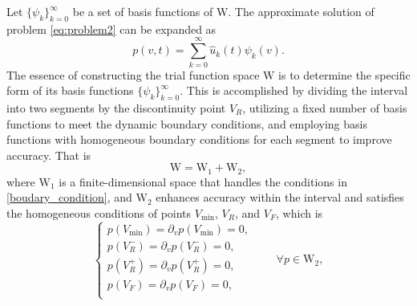 Let $\{\psi_k\}_{k=0}^{\infty}$ be a set of basis functions of $\mathrm{W}$. The approximate solution of problem \eqref{eq:problem2} can be expanded as
\begin{equation}
    \label{eq:approximate_solution1}
    p(v,t)=\sum_{k=0}^{\infty}\hat{u}_k(t)\psi_k(v).
\end{equation}
The essence of constructing the trial function space $\mathrm{W}$ is to determine the specific form of its basis functions $\{\psi_k\}_{k=0}^{\infty}$. This is accomplished by dividing the interval into two segments by the discontinuity point $V_R$, utilizing a fixed number of basis functions to meet the dynamic boundary conditions, and employing basis functions with homogeneous boundary conditions for each segment to improve accuracy. That is
\begin{equation}
    \mathrm{W}=\mathrm{W}_1+\mathrm{W}_2,
\end{equation}
where $\mathrm{W}_1$ is a finite-dimensional space that handles the conditions in \eqref{boudary_condition}, and $\mathrm{W}_2$ enhances accuracy within the interval and satisfies the homogeneous conditions of points $V_{\min}$, $V_R$, and $V_F$, which is
\begin{equation}
    \label{eq:W2condition}
    \begin{cases}
        p(V_{\min})=\partial _vp(V_{\min})=0,\\
         p(V_R^-)=\partial _vp(V_R^-)=0,\\
         p(V_R^+)=\partial _vp(V_R^+)=0,\\
        p(V_F)=\partial _vp(V_F)=0,\\
    \end{cases}\qquad \forall p \in \mathrm{W}_2,
\end{equation}

